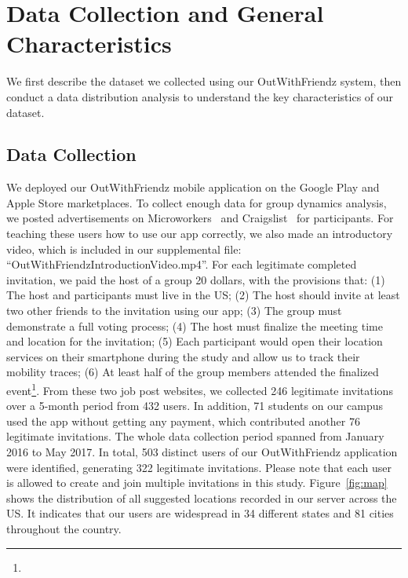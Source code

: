 \section{Data Collection and General Characteristics} 
We first describe the dataset we collected using our OutWithFriendz system, then conduct a data distribution 
analysis to understand the key characteristics of our dataset.

\subsection{Data Collection}
We deployed our OutWithFriendz mobile application on the Google Play and Apple Store marketplaces.
To collect enough data for group dynamics analysis, we posted advertisements on 
Microworkers~\cite{microworkers} and Craigslist~\cite{craigslist}
for participants. For teaching these users how to use our app correctly, we also made an introductory 
video, which is included in our supplemental file: ``OutWithFriendzIntroductionVideo.mp4''. For each 
legitimate completed invitation, we paid the host of a group 20 dollars, with the provisions that: (1) The host 
and participants must live in the US; (2) The host should invite at least two other 
friends to the invitation using our app; 
(3) The group must demonstrate a full voting process; (4) The host must finalize the meeting time  and location
for the invitation; (5) Each participant would open their location services on their smartphone during the study
and allow us to track their mobility traces; (6) At least half of the group members attended the finalized 
event\footnote{}. From these 
two job post websites, we collected 246 legitimate invitations over a 5-month period from 432 users. In addition, 71 
students on our campus used the app without getting any payment, which contributed another
76 legitimate invitations. The whole data collection period spanned from January 2016 to May 2017. In total, 503 distinct users
of our OutWithFriendz application were identified, generating 322 legitimate invitations.  Please note that 
each user is allowed to create and join multiple invitations in this study. 
Figure~\ref{fig:map} shows the distribution of all suggested locations recorded in our server across the US. 
It indicates that our users are widespread in 34 
different states and 81 cities throughout the country.  

